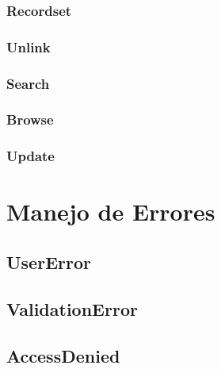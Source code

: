 \documentclass[letterpaper,10pt,spanish]{sphinxmanual}
\begin{document}
\subsubsection{Recordset}
\label{\detokenize{tecnico/orm-api/operaciones-frecuentes:recordset}}

\subsubsection{Unlink}
\label{\detokenize{tecnico/orm-api/operaciones-frecuentes:unlink}}

\subsubsection{Search}
\label{\detokenize{tecnico/orm-api/operaciones-frecuentes:search}}

\subsubsection{Browse}
\label{\detokenize{tecnico/orm-api/operaciones-frecuentes:browse}}

\subsubsection{Update}
\label{\detokenize{tecnico/orm-api/operaciones-frecuentes:update}}

\section{Manejo de Errores}
\label{\detokenize{tecnico/orm-api/manejo-de-errores:manejo-de-errores}}\label{\detokenize{tecnico/orm-api/manejo-de-errores:id1}}\label{\detokenize{tecnico/orm-api/manejo-de-errores::doc}}

\subsection{UserError}
\label{\detokenize{tecnico/orm-api/manejo-de-errores:usererror}}

\subsection{ValidationError}
\label{\detokenize{tecnico/orm-api/manejo-de-errores:validationerror}}

\subsection{AccessDenied}
\label{\detokenize{tecnico/orm-api/manejo-de-errores:accessdenied}}
\end{document}
